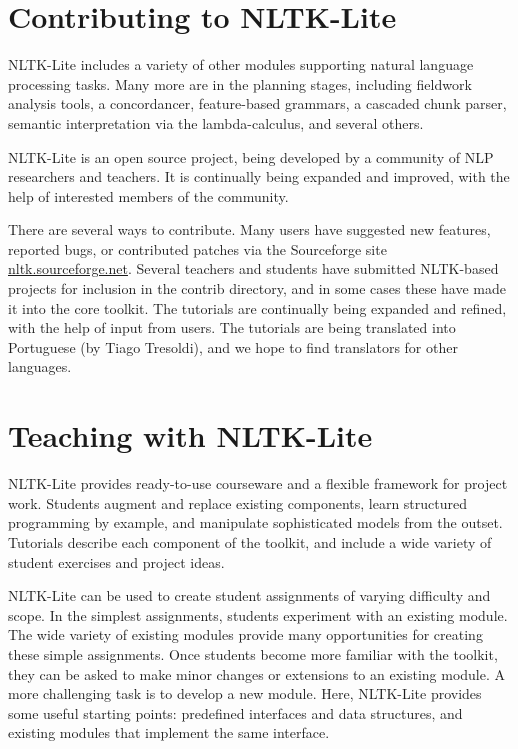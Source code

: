 \documentclass[11pt]{article}
\begin{document}
\section{Contributing to NLTK-Lite}

NLTK-Lite includes a variety of other modules supporting natural
language processing tasks.  Many more are in the planning stages,
including fieldwork analysis tools, a concordancer, feature-based
grammars, a cascaded chunk parser, semantic interpretation via the
lambda-calculus, and several others.

NLTK-Lite is an open source project, being developed by a community of
NLP researchers and teachers. It is continually being expanded and
improved, with the help of interested members of the community.

There are several ways to contribute.  Many users have suggested new
features, reported bugs, or contributed patches via the Sourceforge
site \url{nltk.sourceforge.net}.  Several teachers and students have
submitted NLTK-based projects for inclusion in the contrib directory,
and in some cases these have made it into the core toolkit.  The
tutorials are continually being expanded and refined, with the help of
input from users.  The tutorials are being translated into Portuguese
(by Tiago Tresoldi), and we hope to find translators for other
languages.

\section{Teaching with NLTK-Lite}

NLTK-Lite provides ready-to-use courseware and a flexible framework
for project work. Students augment and replace existing components,
learn structured programming by example, and manipulate sophisticated
models from the outset.  Tutorials describe each component of the
toolkit, and include a wide variety of student exercises and project
ideas.

NLTK-Lite can be used to create student assignments of varying
difficulty and scope. In the simplest assignments, students experiment
with an existing module. The wide variety of existing modules provide
many opportunities for creating these simple assignments. Once
students become more familiar with the toolkit, they can be asked to
make minor changes or extensions to an existing module. A more
challenging task is to develop a new module.  Here, NLTK-Lite provides some
useful starting points: predefined interfaces and data structures, and
existing modules that implement the same interface.
\end{document}
